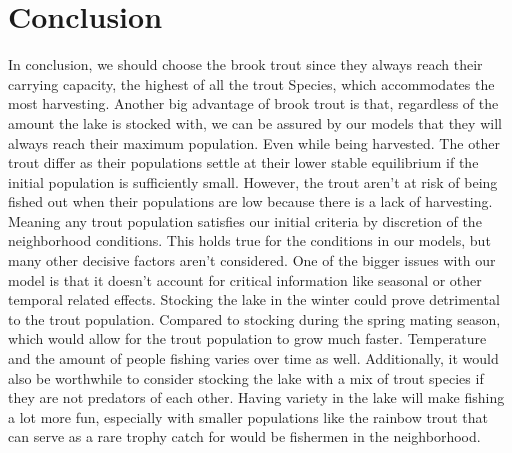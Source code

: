 \documentclass[letterpaper,12pt]{article}
\begin{document}
\section{Conclusion}
In conclusion, we should choose the brook trout since they always reach their carrying capacity, the highest of all the trout Species, which accommodates the most harvesting. 
Another big advantage of brook trout is that, regardless of the amount the lake is stocked with, we can be assured by our models that they will always reach their maximum population. Even while being harvested. 
The other trout differ as their populations settle at their lower stable equilibrium if the initial population is sufficiently small. 
However, the trout aren’t at risk of being fished out when their populations are low because there is a lack of harvesting. Meaning any trout population satisfies our initial criteria by discretion of the neighborhood conditions. 
This holds true for the conditions in our models, but many other decisive factors aren’t considered.
\newline
\indent One of the bigger issues with our model is that it doesn't account for critical information like seasonal or other temporal related effects. 
Stocking the lake in the winter could prove detrimental to the trout population. 
Compared to stocking during the spring mating season, which would allow for the trout population to grow much faster. 
Temperature and the amount of people fishing varies over time as well. 
Additionally, it would also be worthwhile to consider stocking the lake with a mix of trout species if they are not predators of each other. 
Having variety in the lake will make fishing a lot more fun, especially with smaller populations like the rainbow trout that can serve as a rare trophy catch for would be fishermen in the neighborhood.
\end{document}
